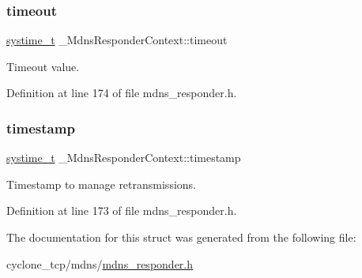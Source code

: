 \mbox{\label{struct__MdnsResponderContext_a7978f47575bd7db7c981429b000a3173}} 
\subsubsection{\texorpdfstring{timeout}{timeout}}
{\footnotesize\ttfamily \hyperlink{compiler__port_8h_ae3e32a98d431a02106616da3071832dd}{systime\+\_\+t} \+\_\+\+Mdns\+Responder\+Context\+::timeout}



Timeout value. 



Definition at line 174 of file mdns\+\_\+responder.\+h.

\mbox{\label{struct__MdnsResponderContext_a15e1a1f5a529577dc13df6b52cceb374}} 
\subsubsection{\texorpdfstring{timestamp}{timestamp}}
{\footnotesize\ttfamily \hyperlink{compiler__port_8h_ae3e32a98d431a02106616da3071832dd}{systime\+\_\+t} \+\_\+\+Mdns\+Responder\+Context\+::timestamp}



Timestamp to manage retransmissions. 



Definition at line 173 of file mdns\+\_\+responder.\+h.



The documentation for this struct was generated from the following file\+:\begin{DoxyCompactItemize}
\item 
cyclone\+\_\+tcp/mdns/\hyperlink{mdns__responder_8h}{mdns\+\_\+responder.\+h}\end{DoxyCompactItemize}
